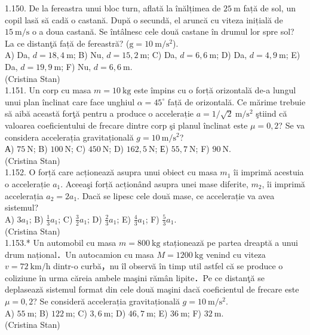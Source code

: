 1.150. De la fereastra unui bloc turn, aflată la înălțimea de $25 \mathrm{~m}$ față de sol, un copil lasă să cadă o castană. După o secundă, el aruncă cu viteza inițială de $15 \mathrm{~m} / \mathrm{s}$ o a doua castană. Se întâlnesc cele două castane în drumul lor spre sol? La ce distanţă față de fereastră? ($\mathrm{g}=10 \mathrm{~m} / \mathrm{s}^{2}$).\\ A) Da, $d=18,4 \mathrm{~m}$; B) Nu, $d=15,2 \mathrm{~m}$; C) Da, $d=6,6 \mathrm{~m}$; D) Da, $d=4,9 \mathrm{~m}$; E) Da, $d=19,9 \mathrm{~m}$; F) Nu, $d=6,6 \mathrm{~m}$.\\ (Cristina Stan)\\

1.151. Un corp cu masa $m=10 \mathrm{~kg}$ este împins cu o forță orizontală de-a lungul unui plan înclinat care face unghiul $\alpha=45^{\circ}$ față de orizontală. Ce mărime trebuie să aibă această forţă pentru a produce o accelerație $a=1 / \sqrt{2} \mathrm{~m} / \mathrm{s}^{2}$ ştiind că valoarea coeficientului de frecare dintre corp şi planul înclinat este $\mu=0,2$? Se va considera accelerația gravitațională $g=10 \mathrm{~m} / \mathrm{s}^{2}$?\\ А) $75 \mathrm{~N}$; B) $100 \mathrm{~N}$; C) $450 \mathrm{~N}$; D) $162,5 \mathrm{~N}$; Е) $55,7 \mathrm{~N}$; F) $90 \mathrm{~N}$.\\ (Cristina Stan)\\

1.152. O forță care acționează asupra unui obiect cu masa $m_{1}$ îi imprimă acestuia o accelerație $a_{1}$. Aceeaşi forță acționând asupra unei mase diferite, $m_{2}$, îi imprimă accelerația $a_{2}=2 a_{1}$. Dacă se lipesc cele două mase, ce accelerație va avea sistemul?\\ A) $3 a_{1}$; B) $\frac{1}{3} a_{1}$; C) $\frac{3}{2} a_{1}$; D) $\frac{2}{3} a_{1}$; E) $\frac{4}{3} a_{1}$; F) $\frac{5}{3} a_{1}$.\\ (Cristina Stan)\\

1.153.* Un automobil cu masa $m=800 \mathrm{~kg}$ staționează pe partea dreaptă a unui drum național．Un autocamion cu masa $M=1200 \mathrm{~kg}$ venind cu viteza $v=72 \mathrm{~km} / \mathrm{h}$ dintr-o curbă，nu îl observă în timp util astfel că se produce o coliziune în urma căreia ambele maşini rămân lipite．Pe ce distanţă se deplasează sistemul format din cele două maşini dacă coeficientul de frecare este $\mu=0,2$? Se consideră accelerația gravitațională $g=10 \mathrm{~m} / \mathrm{s}^{2}$.\\ A) $55 \mathrm{~m}$; B) $122 \mathrm{~m}$; C) $3,6 \mathrm{~m}$; D) $46,7 \mathrm{~m}$; E) $36 \mathrm{~m}$; F) $32 \mathrm{~m}$.\\ (Cristina Stan) \\

